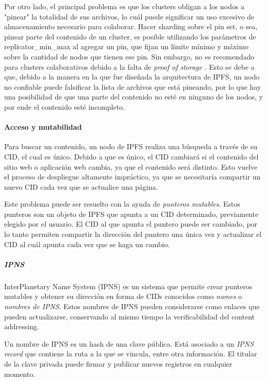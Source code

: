 Por otro lado, el principal problema es que los clusters obligan a los nodos a "pinear" la totalidad de sus archivos, lo cuál puede significar un uso excesivo de almacenamiento necesario para colaborar. Hacer sharding sobre el pin set, o sea, pinear parte del contenido de un cluster, es posible utilizando los parámetros de replicator\_min\_max al agregar un pin, que fijan un límite mínimo y máximo sobre la cantidad de nodos que tienen ese pin. Sin embargo, no es recomendado para clusters colaborativos debido a la falta de \textit{proof of storage} \cite{cluster-sharding} \cite{collaborative-clusters-setup}. Esto se debe a que, debido a la manera en la que fue diseñada la arquitectura de IPFS, un nodo no confiable puede falsificar la lista de archivos que está pineando, por lo que hay una posibilidad de que una parte del contenido no esté en ninguno de los nodos, y por ende el contenido esté incompleto.

\paragraph{Acceso y mutabilidad}

Para buscar un contenido, un nodo de IPFS realiza una búsqueda a través de su CID, el cual es único. Debido a que es único, el CID cambiará si el contenido del sitio web o aplicación web cambia, ya que el contenido será distinto. Esto vuelve el proceso de despliegue altamente impráctico, ya que se necesitaría compartir un nuevo CID cada vez que se actualice una página.

Este problema puede ser resuelto con la ayuda de \textit{punteros mutables}. Estos punteros son un objeto de IPFS que apunta a un CID determinado, previamente elegido por el usuario. El CID al que apunta el puntero puede ser cambiado, por lo tanto permiten compartir la dirección del puntero una única vez y actualizar el CID al cuál apunta cada vez que se haga un cambio.

\subparagraph{IPNS}

InterPlanetary Name System (IPNS) \cite{ipns} es un sistema que permite crear  punteros mutables y obtener su dirección en forma de CIDs conocidos como \textit{names} o \textit{nombres de IPNS}. Estos nombres de IPNS pueden considerarse como enlaces que pueden actualizarse, conservando al mismo tiempo la verificabilidad del content addressing.

Un nombre de IPNS es un hash de una \cite{ipns-hash} clave pública. Está asociado a un \textit{IPNS record} \cite{ipns-record} que contiene la ruta a la que se vincula, entre otra información. El titular de la clave privada puede firmar y publicar nuevos registros en cualquier momento.

